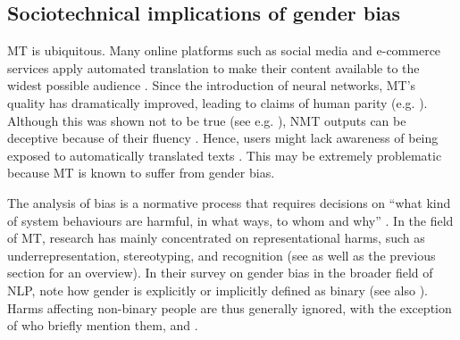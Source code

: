 
\subsection{Sociotechnical implications of gender bias} \label{sub:sociotechnical}

MT is ubiquitous. Many online platforms such as social media and e-commerce services apply automated translation to make their content available to the widest possible audience \citep[457]{monti2020gender}. Since the introduction of neural networks, MT's quality has dramatically improved, leading to claims of human parity (e.g. \cite{hassan2018achieving}). Although this was shown not to be true (see e.g. \cite{laubli-etal-2018-machine}), NMT outputs can be deceptive because of their fluency \citep{laubli-etal-2018-machine,toral-etal-2018-attaining,laubli2020set}. Hence, users might lack awareness of being exposed to automatically translated texts \citep{martindale2018fluency}. This may be extremely problematic because MT is known to suffer from gender bias.

The analysis of bias is a normative process that requires decisions on ``what kind of system behaviours are harmful, in what ways, to whom and why'' \citep[5454]{blodgett-etal-2020-language}. In the field of MT, research has mainly concentrated on representational harms, such as underrepresentation, stereotyping, and recognition (see \cite{savoldi2021gender} as well as the previous section for an overview). In their survey on gender bias in the broader field of NLP, \textcite{stanczak2021survey} note how gender is explicitly or implicitly defined as binary (see also \cite{sun2019mitigating,cao-daume-iii-2020-toward}). Harms affecting non-binary people are thus generally ignored, with the exception of \textcite{savoldi2021gender} who briefly mention them, and \textcite{dev-etal-2021-harms}. 

